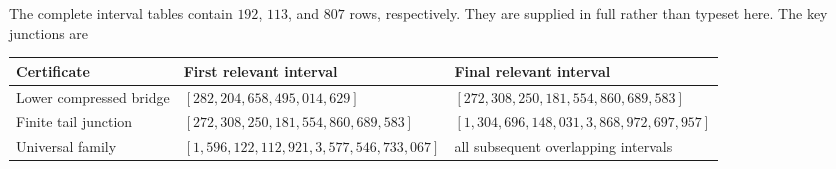 \documentclass[11pt]{article}
\theoremstyle{definition}
\theoremstyle{remark}
\begin{document}
The complete interval tables contain $192$, $113$, and $807$ rows,
respectively.  They are supplied in full rather than typeset here.  The key
junctions are
\begin{center}
\small
\begin{tabularx}{\textwidth}{@{}l>{\raggedright\arraybackslash}X>{\raggedright\arraybackslash}X@{}}
\toprule
Certificate & First relevant interval & Final relevant interval\\
\midrule
Lower compressed bridge &
$[282{,}204{,}658,495{,}014{,}629]$ &
$[272{,}308{,}250{,}181,554{,}860{,}689{,}583]$\\
Finite tail junction &
$[272{,}308{,}250{,}181,554{,}860{,}689{,}583]$ &
$[1{,}304{,}696{,}148{,}031,3{,}868{,}972{,}697{,}957]$\\
Universal family &
$[1{,}596{,}122{,}112{,}921,3{,}577{,}546{,}733{,}067]$ &
all subsequent overlapping intervals\\
\bottomrule
\end{tabularx}
\end{center}
\end{document}
